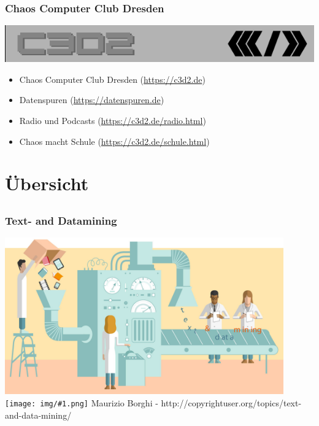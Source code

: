 \documentclass[12pt]{beamer}
\newcommand{\cc}[1]{\texttt{[image: img/\#1.png]}\hspace{1mm}}
\begin{document}
\begin{frame}
  \frametitle{Chaos Computer Club Dresden}
  \begin{center}
    \includegraphics[height=0.1\textheight]{img/c3d2_logo.png}
  \end{center}
  \begin{itemize}
    \item<1-> Chaos Computer Club Dresden (\url{https://c3d2.de})
    \item<2-> Datenspuren (\url{https://datenspuren.de})
    \item<3-> Radio und Podcasts (\url{https://c3d2.de/radio.html})
    \item<4-> Chaos macht Schule (\url{https://c3d2.de/schule.html})
  \end{itemize}
\end{frame}

\section{Übersicht}
\subsection{}

\begin{frame}
  \frametitle{Text- and Datamining}
  \begin{center}
    \includegraphics[width=0.9\textwidth]{img/text_data_mining.jpg} \\
    \tiny \cc{by} Maurizio Borghi - http://copyrightuser.org/topics/text-and-data-mining/
  \end{center}
\end{frame}
\end{document}
